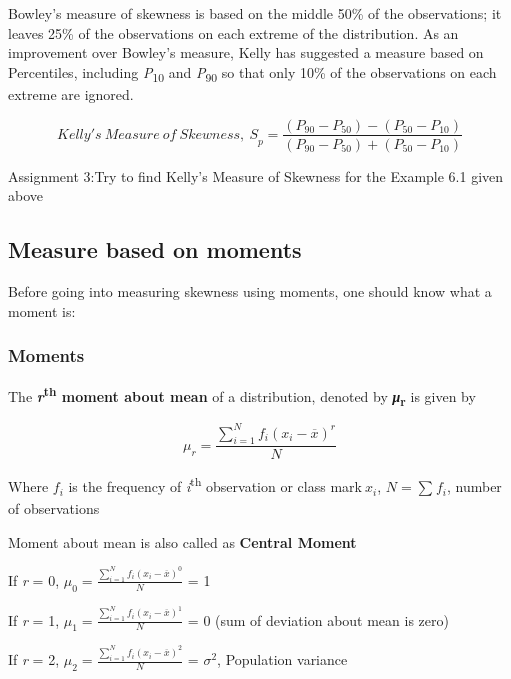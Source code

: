 \documentclass[
]{book}
\begin{document}
Bowley's measure of skewness is based on the middle 50\% of the
observations; it leaves 25\% of the observations on each extreme of the
distribution. As an improvement over Bowley's measure, Kelly has
suggested a measure based on Percentiles, including \emph{P}\textsubscript{10} and \emph{P}\textsubscript{90}
so that only 10\% of the observations on each extreme are ignored.

\[{Kelly's\ Measure\ of\ Skewness,\ S}_{p} = \frac{\left( P_{90} - P_{50} \right) - \left( P_{50} - P_{10} \right)}{\left( P_{90} - P_{50} \right) + \left( P_{50} - P_{10} \right)}\]

\begin{rmdnote}
Assignment 3:Try to find Kelly's Measure of Skewness
for the Example 6.1 given above
\end{rmdnote}

\hypertarget{measure-based-on-moments}{%
\subsection{Measure based on moments}\label{measure-based-on-moments}}

Before going into measuring skewness using moments, one should know what
a moment is:

\hypertarget{moments}{%
\subsubsection{Moments}\label{moments}}

The \textbf{\emph{r}\textsuperscript{th} moment about mean} of a distribution, denoted by
\textbf{\emph{μ}\textsubscript{r}} is given by

\[\mu_{r} = \frac{\sum_{i = 1}^{N}{f_{i}\left( x_{i} - \overline{x} \right)^{r}}}{N}\]

Where \(f_{i}\) is the frequency of \emph{i}\textsuperscript{th} observation or class
mark\(\ x_{i}\), \(N = \sum_{}^{}f_{i}\), number of observations

Moment about mean is also called as \textbf{Central Moment}

If \emph{r} = 0,
\(\mu_{0} = \frac{\sum_{i = 1}^{N}{f_{i}\left( x_{i} - \overline{x} \right)^{0}}}{N}\)
= 1

If \emph{r} = 1,
\(\mu_{1} = \frac{\sum_{i = 1}^{N}{f_{i}\left( x_{i} - \overline{x} \right)^{1}}}{N}\)
= 0 (sum of deviation about mean is zero)

If \emph{r} = 2,
\(\mu_{2} = \frac{\sum_{i = 1}^{N}{f_{i}\left( x_{i} - \overline{x} \right)^{2}}}{N}\)
= \(\sigma^{2}\), Population variance
\end{document}
